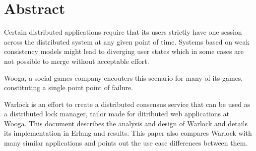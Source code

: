 \chapter{Abstract}

Certain distributed applications require that its users strictly have one
session across the distributed system at any given point of time. Systems
based on weak consistency models might lead to diverging user states which
in some cases are not possible to merge without acceptable effort.

Wooga, a social games company encouters this scenario for many of its
games, constituting a single point point of failure.

Warlock is an effort to create a distributed consensus service that can
be used as a distributed lock manager, tailor made for ditributed web
applications at Wooga. This document describes the analysis and design of
Warlock and details its implementation in Erlang and results. 
This paper also compares Warlock with many similar applications and points
out the use case differences between them.
